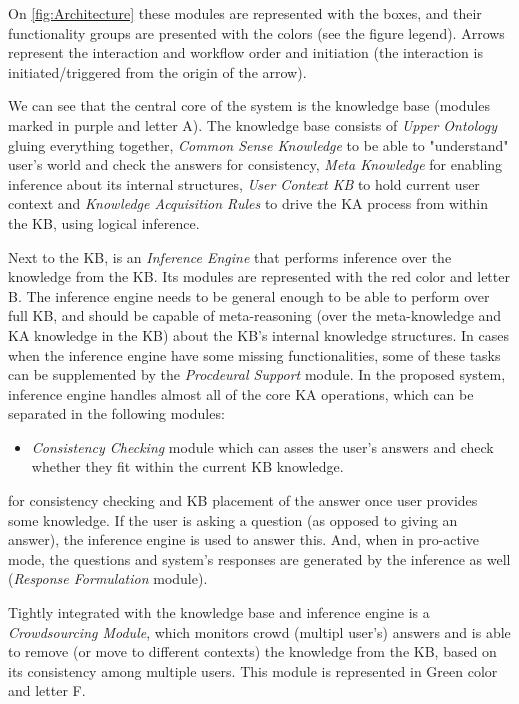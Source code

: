 On \autoref{fig:Architecture} these modules are represented with the boxes,
and their functionality groups are presented with the colors (see the figure
legend). Arrows represent the interaction and workflow order and initiation 
(the interaction is initiated/triggered from the origin of the arrow).

We can see that the central core of the
system is the knowledge base (modules marked in purple and letter A). The 
knowledge base consists of \emph{Upper Ontology} gluing everything together, 
\emph{Common Sense Knowledge} to be able to "understand" user's world and check
the answers for consistency, \emph{Meta Knowledge} for enabling inference about 
its internal structures, \emph{User Context KB} to hold current user context and 
\emph{Knowledge Acquisition Rules} to drive the KA process from within the KB, 
using logical inference. 

Next to the KB, is an \emph{Inference Engine} that performs inference over 
the knowledge from the KB. Its modules are represented with the red color 
and letter B. The inference engine needs to be general enough to be able to
perform over full KB, and should be capable of meta-reasoning (over the 
meta-knowledge and KA knowledge in the KB) about the KB's internal knowledge
structures. In cases when the inference engine have some missing functionalities,
some of these tasks can be supplemented by the \emph{Procdeural Support} 
module. In the proposed system, inference engine handles almost all of the 
core KA operations, which can be separated in the following modules:
\begin{itemize}
\item \emph{Consistency Checking} module which can asses the user's answers
and check whether they fit within the current KB knowledge.

\end{itemize}
 for consistency checking
and KB placement of the answer once user provides some knowledge. If the
user is asking a question (as opposed to giving an answer), the inference engine
is used to answer this. And, when in pro-active mode, the questions and 
system's responses are generated by the inference as well (\emph{Response
Formulation} module).

Tightly integrated with the knowledge base and inference engine is a 
\emph{Crowdsourcing Module}, which monitors crowd (multipl user's) answers and 
is able to remove (or move to different contexts) the knowledge from the KB, 
based on its consistency among multiple users. This module is represented in
Green color and letter F.

